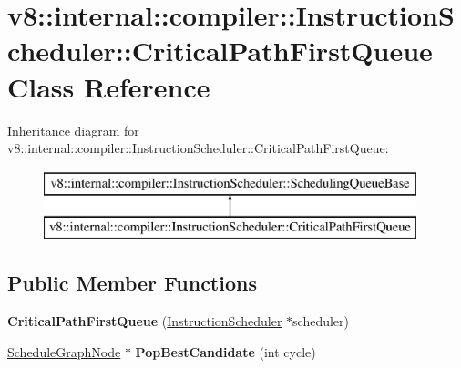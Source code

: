 \hypertarget{classv8_1_1internal_1_1compiler_1_1_instruction_scheduler_1_1_critical_path_first_queue}{}\section{v8\+:\+:internal\+:\+:compiler\+:\+:Instruction\+Scheduler\+:\+:Critical\+Path\+First\+Queue Class Reference}
\label{classv8_1_1internal_1_1compiler_1_1_instruction_scheduler_1_1_critical_path_first_queue}
Inheritance diagram for v8\+:\+:internal\+:\+:compiler\+:\+:Instruction\+Scheduler\+:\+:Critical\+Path\+First\+Queue\+:\begin{figure}[H]
\begin{center}
\leavevmode
\includegraphics[height=2.000000cm]{classv8_1_1internal_1_1compiler_1_1_instruction_scheduler_1_1_critical_path_first_queue}
\end{center}
\end{figure}
\subsection*{Public Member Functions}
\begin{DoxyCompactItemize}
\item 
{\bfseries Critical\+Path\+First\+Queue} (\hyperlink{classv8_1_1internal_1_1compiler_1_1_instruction_scheduler}{Instruction\+Scheduler} $\ast$scheduler)\hypertarget{classv8_1_1internal_1_1compiler_1_1_instruction_scheduler_1_1_critical_path_first_queue_a1d49a94991f50733097e1e84c9769edf}{}\label{classv8_1_1internal_1_1compiler_1_1_instruction_scheduler_1_1_critical_path_first_queue_a1d49a94991f50733097e1e84c9769edf}

\item 
\hyperlink{classv8_1_1internal_1_1compiler_1_1_instruction_scheduler_1_1_schedule_graph_node}{Schedule\+Graph\+Node} $\ast$ {\bfseries Pop\+Best\+Candidate} (int cycle)\hypertarget{classv8_1_1internal_1_1compiler_1_1_instruction_scheduler_1_1_critical_path_first_queue_aaae79b205214e82d932e5166c3daf551}{}\label{classv8_1_1internal_1_1compiler_1_1_instruction_scheduler_1_1_critical_path_first_queue_aaae79b205214e82d932e5166c3daf551}

\end{DoxyCompactItemize}
